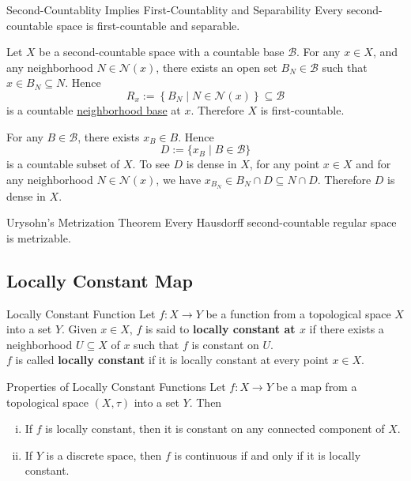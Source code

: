 \documentclass{report}
\begin{document}
\begin{proposition}{Second-Countablity Implies First-Countablity and Separability}{}
	Every second-countable space is first-countable and separable.
\end{proposition}
\begin{prf}
	Let $X$ be a second-countable space with a countable base $\mathcal{B}$. For any $x\in X$, and any neighborhood $N\in\mathcal{N}(x)$, there exists an open set $B_N\in \mathcal{B}$ such that $x\in B_N\subseteq N$. Hence 
	\[  
		R_x:=\left\{B_N \mid N\in\mathcal{N}(x)\right\} \subseteq \mathcal{B}
	\] 
	is a countable \hyperref[th:neighborhood_base]{neighborhood base} at $x$. Therefore $X$ is first-countable.

	For any $B\in\mathcal{B}$, there exists $x_B\in B$. Hence
	\[
		D:=\{x_B\mid B\in\mathcal{B}\}
	\]
	is a countable subset of $X$. To see $D$ is dense in $X$, for any point $x \in X$ and for any neighborhood $N\in\mathcal{N}(x)$, we have $x_{B_N}\in B_N \cap D\subseteq N \cap D $. Therefore $D$ is dense in $X$.
\end{prf}

\begin{theorem}{Urysohn's Metrization Theorem}{}
	Every Hausdorff second-countable regular space is metrizable.
\end{theorem}

\subsection{Locally Constant Map}

\begin{definition}{Locally Constant Function}{}
	Let $f: X \to Y$ be a function from a topological space $X$ into a set $Y$. Given $x \in X$, $f$ is said to \textbf{locally constant at $x$} if there exists a neighborhood $U \subseteq X$ of $x$ such that $f$ is constant on $U$.\\
	$f$ is called \textbf{locally constant} if it is locally constant at every point $x \in X$.
\end{definition}

\begin{proposition}{Properties of Locally Constant Functions}{}
	Let $f: X \to Y$ be a map from a topological space $(X,\tau)$ into a set $Y$. Then
	\begin{enumerate}[(i)]
		\item If $f$ is locally constant, then it is constant on any connected component of $X$.
		\item If $Y$ is a discrete space, then $f$ is continuous if and only if it is locally constant.
	\end{enumerate}
\end{proposition}
\end{document}
